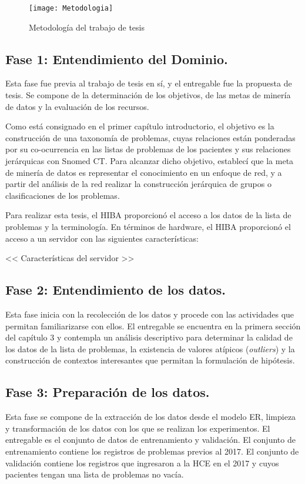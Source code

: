 \begin{figure}[ht]
\caption{Metodología del trabajo de tesis}
\label{fig:Metodologia}
\centering
\texttt{[image: Metodologia]}
\end{figure}

\subsection{Fase 1: Entendimiento del Dominio.} Esta fase fue previa al trabajo de tesis en sí, y el entregable fue la propuesta de tesis. Se compone de la determinación de los objetivos, de las metas de minería de datos y la evaluación de los recursos.

Como está consignado en el primer capítulo introductorio, el objetivo es la construcción de una taxonomía de problemas, cuyas relaciones están ponderadas por su co-ocurrencia en las listas de problemas de los pacientes y sus relaciones jerárquicas con Snomed CT. Para alcanzar dicho objetivo, establecí que la meta de minería de datos es representar el conocimiento en un enfoque de red, y a partir del análisis de la red realizar la construcción jerárquica de grupos o clasificaciones de los problemas.

Para realizar esta tesis, el \acrshort{HIBA} proporcionó el acceso a los datos de la lista de problemas y la terminología. En términos de hardware, el \acrshort{HIBA} proporcionó el acceso a un servidor con las siguientes características:

<< Características del servidor >>

\subsection{Fase 2: Entendimiento de los datos.} Esta fase inicia con la recolección de los datos y procede con las actividades que permitan familiarizarse con ellos. El entregable se encuentra en la primera sección del capítulo 3 y contempla un análisis descriptivo para determinar la calidad de los datos de la lista de problemas, la existencia de valores atípicos (\textit{outliers}) y la construcción de contextos interesantes que permitan la formulación de hipótesis.

\subsection{Fase 3: Preparación de los datos.} Esta fase se compone de la extracción de los datos desde el modelo ER, limpieza y transformación de los datos con los que se realizan los experimentos. El entregable es el conjunto de datos de entrenamiento y validación. El conjunto de entrenamiento contiene los registros de problemas previos al 2017. El conjunto de validación contiene los registros que ingresaron a la \acrshort{HCE} en el 2017 y cuyos pacientes tengan una lista de problemas no vacía.

